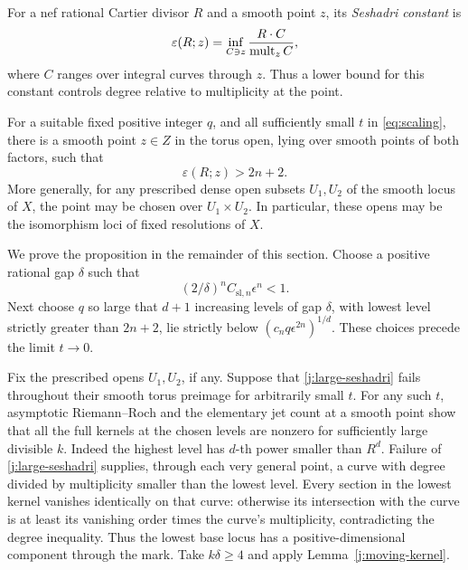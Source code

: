 For a nef rational Cartier divisor $R$ and a smooth point $z$, its
\emph{Seshadri constant} is
\[
 \varepsilon(R;z)=\inf_{C\ni z}\frac{R\cdot C}{\operatorname{mult}_z C},
\]
where $C$ ranges over integral curves through $z$. Thus a lower bound
for this constant controls degree relative to multiplicity at the point.

\begin{proposition}\label{prop:large-seshadri}
For a suitable fixed positive integer $q$, and all sufficiently
small $t$ in \eqref{eq:scaling}, there is a smooth point $z\in Z$
in the torus open, lying over smooth points of both factors, such
that
\begin{equation}\label{j:large-seshadri}
                         \varepsilon(R;z)>2n+2.
\end{equation}
More generally, for any prescribed dense open subsets $U_1,U_2$
of the smooth locus of $X$, the point may be chosen over
$U_1\times U_2$. In particular, these opens may be the
isomorphism loci of fixed resolutions of $X$.
\end{proposition}

We prove the proposition in the remainder of this section. Choose a
positive rational gap $\delta$ such that
\begin{equation}\label{j:slice-gap}
             (2/\delta)^nC_{\mathrm{sl},n}\epsilon^n<1.
\end{equation}
Next choose $q$ so large that $d+1$ increasing levels of gap $\delta$,
with lowest level strictly greater than $2n+2$, lie strictly below
$(c_nq\epsilon^{2n})^{1/d}$. These choices precede the limit
$t\to0$.

Fix the prescribed opens $U_1,U_2$, if any. Suppose that
\eqref{j:large-seshadri} fails throughout their smooth torus
preimage for arbitrarily small $t$. For any such $t$, asymptotic
Riemann--Roch and the elementary
jet count at a smooth point show that all the full kernels at the
chosen levels are nonzero for sufficiently large divisible $k$.
Indeed the highest level has $d$-th power smaller than $R^d$.
Failure of \eqref{j:large-seshadri} supplies, through each very
general point, a curve with degree divided by multiplicity smaller
than the lowest level. Every section in the lowest kernel vanishes
identically on that curve: otherwise its intersection with the
curve is at least its vanishing order times the curve's
multiplicity, contradicting the degree inequality. Thus the lowest
base locus has a positive-dimensional component through the mark.
Take $k\delta\ge4$ and apply Lemma~\ref{j:moving-kernel}.

